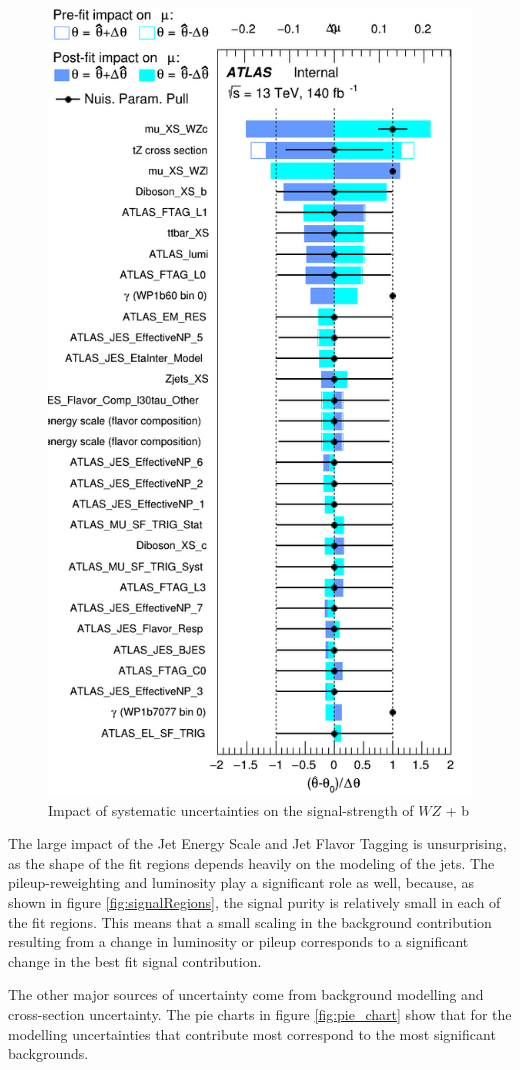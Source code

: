 \documentclass[NOTE, atlasdraft=true, texlive=2016, UKenglish]{\ATLASLATEXPATH atlasdoc}
\begin{document}
\begin{figure}[H]
    \centering
    \includegraphics[width=0.7\linewidth]{all_b/Ranking.png}
    \caption{Impact of systematic uncertainties on the signal-strength of $WZ$ + b}
    \label{fig:ranking}
\end{figure}

The large impact of the Jet Energy Scale and Jet Flavor Tagging is unsurprising, as the shape of the fit regions depends heavily on the modeling of the jets. The pileup-reweighting and luminosity play a significant role as well, because, as shown in figure \ref{fig:signalRegions}, the signal purity is relatively small in each of the fit regions. This means that a small scaling in the background contribution resulting from a change in luminosity or pileup corresponds to a significant change in the best fit signal contribution.

The other major sources of uncertainty come from background modelling and cross-section uncertainty. The pie charts in figure \ref{fig:pie_chart} show that for the modelling uncertainties that contribute most correspond to the most significant backgrounds. 
\end{document}
